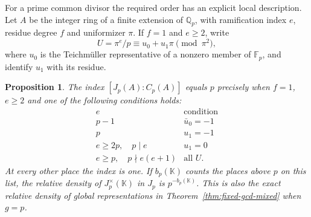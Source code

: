 \documentclass[11pt,letterpaper]{article}
\newtheorem{proposition}[proposition]{Proposition}
\theoremstyle{definition}
\numberwithin{equation}{section}
\begin{document}
For a prime common divisor the required order has an explicit local
description. Let $A$ be the integer ring of a finite extension of
$\mathbb Q_p$, with ramification index $e$, residue degree $f$ and
uniformizer $\pi$. If $f=1$ and $e\ge2$, write
\[
 U=\pi^e/p\equiv u_0+u_1\pi\pmod{\pi^2},
\]
where $u_0$ is the Teichm\"uller representative of a nonzero member
of $\mathbb F_p$, and identify $u_1$ with its residue.

\begin{proposition}\label{prop:mixed-unit-squares}
The index $[J_p(A):C_p(A)]$ equals $p$ precisely when $f=1$,
$e\ge2$ and one of the following conditions holds:
\[
\begin{array}{c|c}
 e & \text{condition}\\\hline
 p-1&\bar u_0=-1\\
 p&u_1=-1\\
 e\ge2p,\quad p\mid e &u_1=0\\
 e\ge p,\quad p\nmid e(e+1)&\text{all } U .
\end{array}
\]
At every other place the index is one. If $b_p(\mathbb K)$ counts
the places above $p$ on this list, the relative density of
$J_p^\times(\mathbb K)$ in $J_p$ is $p^{-b_p(\mathbb K)}$.
This is also the exact relative density of global representations in
Theorem~\ref{thm:fixed-gcd-mixed} when $g=p$.
\end{proposition}
\end{document}
